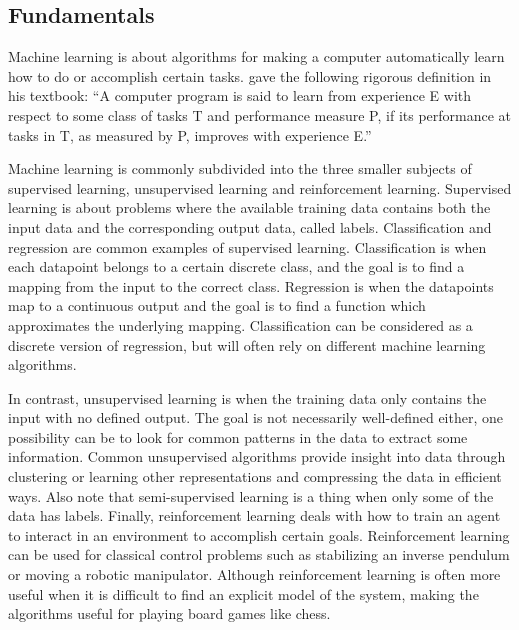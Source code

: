 \documentclass[12pt,a4paper]{book}
\begin{document}
\subsection{Fundamentals}

Machine learning is about algorithms for making a computer automatically learn how to do or accomplish certain tasks. \cite{mitchellmachinelearning} gave the following rigorous definition in his textbook: ``A computer program is said to learn from experience E with respect to some class of tasks T and performance measure P, if its performance at tasks in T, as measured by P, improves with experience E.''

Machine learning is commonly subdivided into the three smaller subjects of supervised learning, unsupervised learning and reinforcement learning. Supervised learning is about problems where the available training data contains both the input data and the corresponding output data, called labels. Classification and regression are common examples of supervised learning. Classification is when each datapoint belongs to a certain discrete class, and the goal is to find a mapping from the input to the correct class. Regression is when the datapoints map to a continuous output and the goal is to find a function which approximates the underlying mapping. Classification can be considered as a discrete version of regression, but will often rely on different machine learning algorithms.


In contrast, unsupervised learning is when the training data only contains the input with no defined output. The goal is not necessarily well-defined either, one possibility can be to look for common patterns in the data to extract some information. Common unsupervised algorithms provide insight into data through clustering or learning other representations and compressing the data in efficient ways. Also note that semi-supervised learning is a thing when only some of the data has labels. Finally, reinforcement learning deals with how to train an agent to interact in an environment to accomplish certain goals. Reinforcement learning can be used for classical control problems such as stabilizing an inverse pendulum or moving a robotic manipulator. Although reinforcement learning is often more useful when it is difficult to find an explicit model of the system, making the algorithms useful for playing board games like chess.
\end{document}
